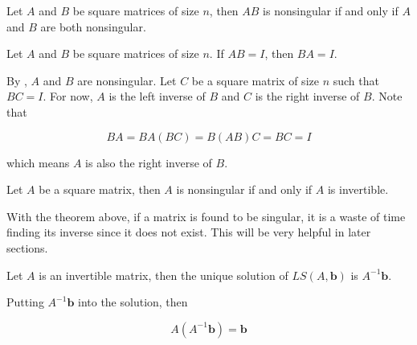 \documentclass[a4paper,12pt]{article}
\begin{document}
\begin{thm}
  Let $A$ and $B$ be square matrices of size $n$, then $AB$ is nonsingular if and only if $A$ and $B$ are both nonsingular.
\end{thm}\n

\begin{thm}
  Let $A$ and $B$ be square matrices of size $n$. If $AB=I$, then $BA=I$.\n

  \prf By \rthm[\sctd{1}], $A$ and $B$ are nonsingular. Let $C$ be a square matrix of size $n$ such that $BC=I$. For now, $A$ is the left inverse of $B$ and $C$ is the right inverse of $B$. Note that

  $$BA=BA(BC)=B(AB)C=BC=I$$\s

  which means $A$ is also the right inverse of $B$.
\end{thm}\n

\begin{thm}
  Let $A$ be a square matrix, then $A$ is nonsingular if and only if $A$ is invertible.
\end{thm}\n

With the theorem above, if a matrix is found to be singular, it is a waste of time finding its inverse since it does not exist. This will be very helpful in later sections.\n

\begin{thm}
  Let $A$ is an invertible matrix, then the unique solution of $LS(A,\mathbf{b})$ is $A^{-1}\mathbf{b}$.\n

  \prf Putting $A^{-1}\mathbf{b}$ into the solution, then

  $$A(A^{-1}\mathbf{b})=\mathbf{b}$$
\end{thm}\n
\end{document}
